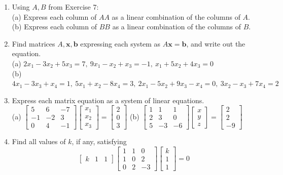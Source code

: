 \documentclass{article}
\theoremstyle{mystyle}
\begin{document}
\begin{enumerate}
    \item[9.] Using $A,B$ from Exercise 7:\\
    (a) Express each column of $AA$ as a linear combination of the columns of $A$.\\
    (b) Express each column of $BB$ as a linear combination of the columns of $B$.

    \item[11.] Find matrices $A,\mathbf{x},\mathbf{b}$ expressing each system as $A\mathbf{x}=\mathbf{b}$, and write out the equation.\\
    (a) $2x_1-3x_2+5x_3=7,\ 9x_1-x_2+x_3=-1,\ x_1+5x_2+4x_3=0$\\
    (b) $4x_1-3x_3+x_4=1,\ 5x_1+x_2-8x_4=3,\ 2x_1-5x_2+9x_3-x_4=0,\ 3x_2-x_3+7x_4=2$

    \item[13.] Express each matrix equation as a system of linear equations.\\
    (a) $\begin{bmatrix}5&6&-7\\-1&-2&3\\0&4&-1\end{bmatrix}\begin{bmatrix}x_1\\x_2\\x_3\end{bmatrix}=\begin{bmatrix}2\\0\\3\end{bmatrix}$\qquad
    (b) $\begin{bmatrix}1&1&1\\2&3&0\\5&-3&-6\end{bmatrix}\begin{bmatrix}x\\y\\z\end{bmatrix}=\begin{bmatrix}2\\2\\-9\end{bmatrix}$

    \item[15.] Find all values of $k$, if any, satisfying
    \[
    \begin{bmatrix}k&1&1\end{bmatrix}\begin{bmatrix}1&1&0\\1&0&2\\0&2&-3\end{bmatrix}\begin{bmatrix}k\\1\\1\end{bmatrix}=0
    \]


\end{enumerate}
\end{document}
